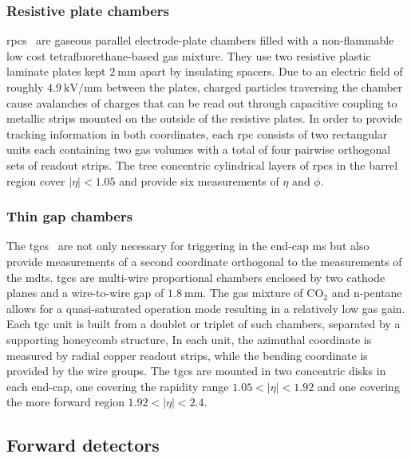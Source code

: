 \subsubsection{Resistive plate chambers}

\glspl{rpc}~\cite{Aad:2008zzm} are gaseous parallel electrode-plate chambers filled with a non-flammable low cost tetrafluorethane-based gas mixture. They use two resistive plastic laminate plates kept $\SI{2}{\milli\meter}$ apart by insulating spacers. Due to an electric field of roughly $\SI{4.9}{\kilo\volt\per\milli\meter}$ between the plates, charged particles traversing the chamber cause avalanches of charges that can be read out through capacitive coupling to metallic strips mounted on the outside of the resistive plates. In order to provide tracking information in both coordinates, each \gls{rpc} consists of two rectangular units each containing two gas volumes with a total of four pairwise orthogonal sets of readout strips. The tree concentric cylindrical layers of \glspl{rpc} in the barrel region cover $\vert\eta\vert <1.05$ and provide six measurements of $\eta$ and $\phi$. %

\subsubsection{Thin gap chambers}

The \glspl{tgc}~\cite{Aad:2008zzm} are not only necessary for triggering in the end-cap \gls{ms} but also provide measurements of a second coordinate orthogonal to the measurements of the \glspl{mdt}. \glspl{tgc} are multi-wire proportional chambers enclosed by two cathode planes and a wire-to-wire gap of $\SI{1.8}{\milli\meter}$. The gas mixture of CO$_2$ and n-pentane allows for a quasi-saturated operation mode resulting in a relatively low gas gain. Each \gls{tgc} unit is built from a doublet or triplet of such chambers, separated by a supporting honeycomb structure, In each unit, the azimuthal coordinate is measured by radial copper readout strips, while the bending coordinate is provided by the wire groups. The \glspl{tgc} are mounted in two concentric disks in each end-cap, one covering the rapidity range $1.05 < \vert\eta\vert < 1.92$ and one covering the more forward region $1.92 < \vert\eta\vert <2.4$. 

\subsection{Forward detectors}

